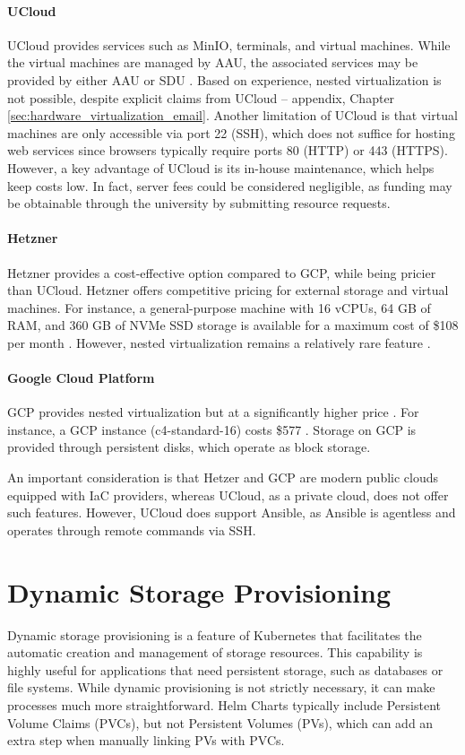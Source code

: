 \paragraph{UCloud} UCloud provides services such as MinIO, terminals, and virtual machines. While the virtual machines are managed by AAU, the associated services may be provided by either AAU or SDU \Parencite{sdu_cloud_providers}. Based on experience, nested virtualization is not possible, despite explicit claims from UCloud -- appendix, Chapter \ref{sec:hardware_virtualization_email}. Another limitation of UCloud is that virtual machines are only accessible via port 22 (SSH), which does not suffice for hosting web services since browsers typically require ports 80 (HTTP) or 443 (HTTPS). However, a key advantage of UCloud is its in-house maintenance, which helps keep costs low. In fact, server fees could be considered negligible, as funding may be obtainable through the university by submitting resource requests. 

\paragraph{Hetzner} Hetzner provides a cost-effective option compared to GCP, while being pricier than UCloud. Hetzner offers competitive pricing for external storage and virtual machines. For instance, a general-purpose machine with 16 vCPUs, 64 GB of RAM, and 360 GB of NVMe SSD storage is available for a maximum cost of \$108 per month \Parencite{hetznercloud}. However, nested virtualization remains a relatively rare feature \Parencite{hetzner_nested_virtualization}.

\paragraph{Google Cloud Platform} GCP provides nested virtualization but at a significantly higher price \Parencite{gcp_nested_virtualization}. For instance, a GCP instance (c4-standard-16) costs \$577 \Parencite{google2025pricing}. Storage on GCP is provided through persistent disks, which operate as block storage.

An important consideration is that Hetzer and GCP are modern public clouds equipped with IaC providers, whereas UCloud, as a private cloud, does not offer such features. However, UCloud does support Ansible, as Ansible is agentless and operates through remote commands via SSH.

\section{Dynamic Storage Provisioning}
Dynamic storage provisioning is a feature of Kubernetes that facilitates the automatic creation and management of storage resources. This capability is highly useful for applications that need persistent storage, such as databases or file systems. While dynamic provisioning is not strictly necessary, it can make processes much more straightforward. Helm Charts typically include Persistent Volume Claims (PVCs), but not Persistent Volumes (PVs), which can add an extra step when manually linking PVs with PVCs.

